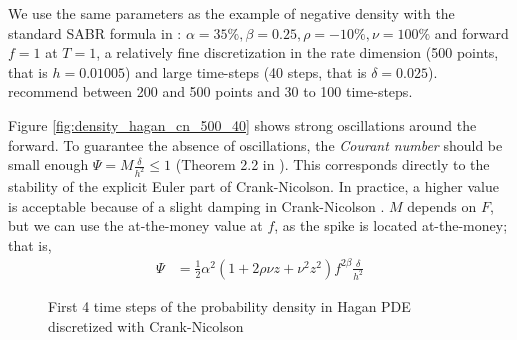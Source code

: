 \documentclass[]{rAMF2e}
\begin{document}
We use the same parameters as the example of negative density with the standard SABR formula in \citep{hagan2013arbitrage}: $\alpha=35\%, \beta=0.25, \rho=-10\%, \nu=100\%$ and forward $f=1$ at $T=1$, a relatively fine discretization in the rate dimension (500 points, that is $h = 0.01005$) and large time-steps (40 steps, that is $\delta=0.025$). \cite{hagan2013arbitrage} recommend between 200 and 500 points and 30 to 100 time-steps.

Figure \ref{fig:density_hagan_cn_500_40} shows strong oscillations around the forward. To guarantee the absence of oscillations, the \emph{Courant number}  should be small enough $\Psi = M \frac{\delta}{h^2}\leq 1$ (Theorem 2.2 in \cite{morton2005numerical}). This corresponds directly to the stability of the explicit Euler part of Crank-Nicolson. In practice, a higher value is acceptable because of a slight damping in Crank-Nicolson \citep{lawson1978extrapolation}. $M$ depends on $F$, but we can use the at-the-money value at $f$, as the spike is located at-the-money; that is, 
\begin{align}
\Psi &= \frac{1}{2} \alpha^2 (1+2\rho\nu z+ \nu^2 z^2) f^{2\beta} \frac{\delta}{h^2}
\end{align} 

\begin{figure}[htb]
  \begin{center}  
  \end{center}
     \caption{\label{fig:density_hagan_500_40_5} First 4 time steps of the probability density in Hagan PDE discretized with Crank-Nicolson}
\end{figure}
\end{document}
